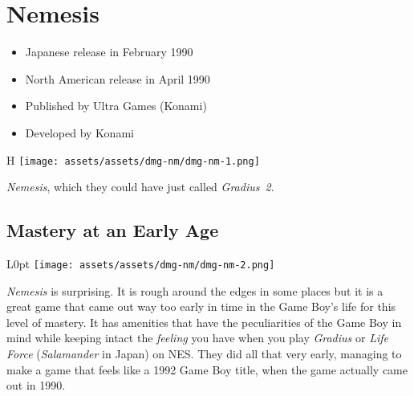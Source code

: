 \documentclass{book}
\let\oldcenter\center
\let\oldendcenter\endcenter
\renewenvironment{center}{\setlength\topsep{0pt}\oldcenter}{\oldendcenter}
\begin{document}
\begin{center}
\vspace{8pt}
\quad\vspace{4pt}
\quad\vspace{4pt}
\end{center}


\begingroup \chapter*{Nemesis} \endgroup

\begin{itemize} \setlength\itemsep{-0.4em}
\item Japanese release in February 1990
\item North American release in April 1990
\item Published by Ultra Games (Konami)
\item Developed by Konami
\end{itemize}\noindent

\begin{wrapfigure}{H}{\linewidth}
\vskip 4pt
\centering \texttt{[image: assets/assets/dmg-nm/dmg-nm-1.png]}\par\pagetwodescription \emph{Nemesis}, which they could have just called \emph{Gradius 2}.\end{wrapfigure}
\clearpage

\FloatBarrier\needspace{5pt}\section*{Mastery at an Early Age}\nopagebreak[4]

\begin{wrapfigure}{L}{0pt} \texttt{[image: assets/assets/dmg-nm/dmg-nm-2.png]}\end{wrapfigure}
\emph{Nemesis} is surprising. It is rough around the edges in some places but it is a great game that came out way too early in time in the Game Boy’s life for this level of mastery. It has amenities that have the peculiarities of the Game Boy in mind while keeping intact the \emph{feeling} you have when you play \emph{Gradius} or \emph{Life Force} (\emph{Salamander} in Japan) on NES. They did all that very early, managing to make a game that feels like a 1992 Game Boy title, when the game actually came out in 1990.
\end{document}
